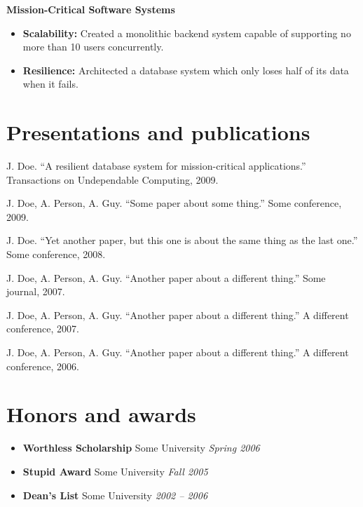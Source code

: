 \documentclass[10pt]{article}
\makeatletter
\newcommand\cdotfill{\leavevmode\cleaders\hb@xt@.33em{\hss.\hss}\hfill\kern\z@}
\newcommand\vbar{\raisebox{.15em}{\resizebox{0.9em}{0.6em}{~\textpipe~\,\,}}}
\newcommand\hdotfill{\small\normalfont~\textls[-50]{\cdotfill}}
\makeatother
\begin{document}
\vspace{0.5em}

{\bf Mission-Critical Software Systems}

\begin{itemize}
\setlength\itemsep{2pt}

\item
\textbf{Scalability:} Created a monolithic backend system capable of supporting no more than 10 users concurrently.

\item
\textbf{Resilience:} Architected a database system which only loses half of its data when it fails.

\end{itemize}

\section{Presentations and publications\hdotfill}

\begin{multicols}{2}

\small

J. Doe. 
``A resilient database system for mission-critical applications.''
Transactions on Undependable Computing, 2009.

J. Doe, A. Person, A. Guy.
``Some paper about some thing.''
Some conference, 2009.

J. Doe.
``Yet another paper, but this one is about the same thing as the last one.''
Some conference, 2008.

\columnbreak

J. Doe, A. Person, A. Guy.
``Another paper about a different thing.''
Some journal, 2007.

J. Doe, A. Person, A. Guy.
``Another paper about a different thing.''
A different conference, 2007.

J. Doe, A. Person, A. Guy.
``Another paper about a different thing.''
A different conference, 2006.

\end{multicols}

\section{Honors and awards \hdotfill} 

\begin{itemize}
	\setlength\itemsep{0pt}
	\item \textbf{Worthless Scholarship} \vbar
		  Some University \vbar
		  \textit{Spring 2006}
	
	\item \textbf{Stupid Award} \vbar
		  Some University \vbar
		  \textit{Fall 2005}
		  
	\item \textbf{Dean's List} \vbar
	      Some University \vbar
	      \textit{2002 -- 2006}
\end{itemize}
\end{document}
